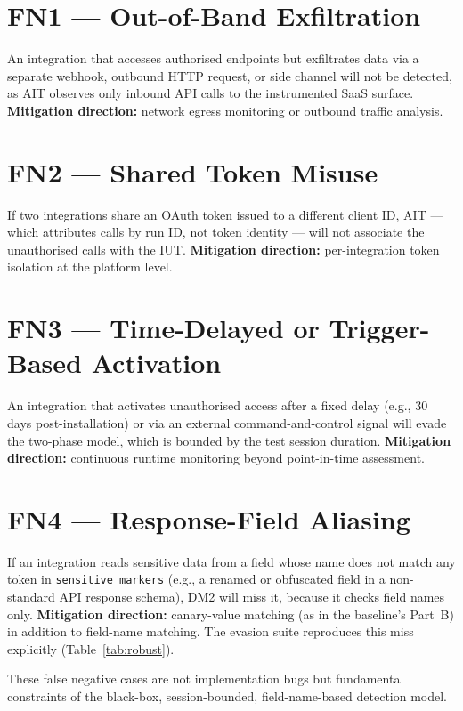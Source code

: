 \documentclass[12pt,a4paper]{report}
\begin{document}
\section{FN1 --- Out-of-Band Exfiltration}

An integration that accesses authorised endpoints but exfiltrates data via a separate webhook,
outbound HTTP request, or side channel will not be detected, as AIT observes only inbound API
calls to the instrumented SaaS surface. \textbf{Mitigation direction:} network egress monitoring
or outbound traffic analysis.

\section{FN2 --- Shared Token Misuse}

If two integrations share an OAuth token issued to a different client ID, AIT --- which attributes
calls by run ID, not token identity --- will not associate the unauthorised calls with the IUT.
\textbf{Mitigation direction:} per-integration token isolation at the platform level.

\section{FN3 --- Time-Delayed or Trigger-Based Activation}

An integration that activates unauthorised access after a fixed delay (e.g., 30 days
post-installation) or via an external command-and-control signal will evade the two-phase model,
which is bounded by the test session duration. \textbf{Mitigation direction:} continuous runtime
monitoring beyond point-in-time assessment.

\section{FN4 --- Response-Field Aliasing}

If an integration reads sensitive data from a field whose name does not match any token in
\texttt{sensitive\_markers} (e.g., a renamed or obfuscated field in a non-standard API response
schema), DM2 will miss it, because it checks field names only. \textbf{Mitigation direction:}
canary-value matching (as in the baseline's Part~B) in addition to field-name matching. The
evasion suite reproduces this miss explicitly (Table~\ref{tab:robust}).

These false negative cases are not implementation bugs but fundamental constraints of the
black-box, session-bounded, field-name-based detection model.
\end{document}
